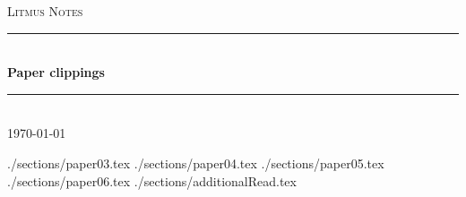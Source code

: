 \documentclass[fleqn,12pts]{article} %
\begin{document}

\begin{titlepage}

\newcommand{\HRule}{\rule{\linewidth}{0.5mm}} %

\center %

\textsc{\Large Litmus Notes}\\[0.5cm] %

\HRule \\[0.4cm]
{ \huge \bfseries Paper clippings}\\[0.4cm] %
\HRule \\[1.5cm]

{\large \today}\\[3cm] %


\vfill %

\end{titlepage}


\tableofcontents %

\newpage %



 {./sections/paper03.tex}
 {./sections/paper04.tex}
 {./sections/paper05.tex}
 {./sections/paper06.tex}
 {./sections/additionalRead.tex}

\end{document}
